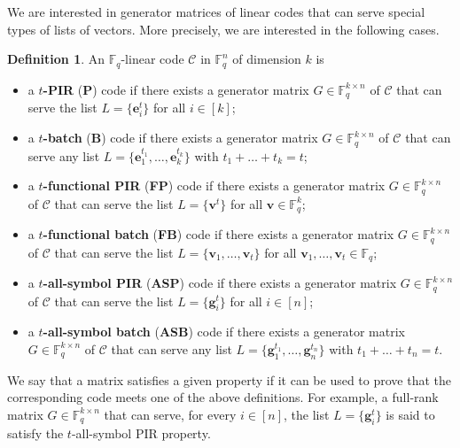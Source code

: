\documentclass[11pt,a4paper]{article}
\theoremstyle{definition}
\newtheorem{definition}[theorem]{Definition}
\newcommand{\bfe}{{\boldsymbol e}}
\newcommand{\bfg}{{\boldsymbol g}}
\newcommand{\bfv}{{\boldsymbol v}}
\newcommand{\F}{\mathbb{F}}
\newcommand{\mC}{\mathcal{C}}
\newcommand{\bcomment}[1]{{\color{blue}#1}}
\newcommand{\pcomment}[1]{{\color{purple}#1}}
\newcommand{\ey}[1]{{\footnotesize [\pcomment{#1}\;\;\bcomment{--Eitan}]}}
\begin{document}
We are interested in generator matrices of linear codes that can serve special types of lists of vectors. More precisely, we are interested in the following cases.

\begin{definition}
An $\F_q$-linear code $\mC$ in $\F_q^n$ of dimension $k$ is 
\begin{itemize}
    \item[(i)] a \textbf{$t$-PIR} (\textbf{P}) code if there exists a generator matrix $G \in \F_q^{k \times n}$ of $\mC$ that can serve the list $L=\{\bfe_i^t\}$ for all $i \in [k]$; 
    \item[(ii)] a \textbf{$t$-batch} (\textbf{B}) code if there exists a generator matrix $G \in \F_q^{k \times n}$ of $\mC$ that can serve any list $L=\{\bfe_1^{t_1},\dots,\bfe_k^{t_k}\}$ with $t_1+\dots + t_k=t$;
    \item[(iii)] a \textbf{$t$-functional PIR} (\textbf{FP}) code if there exists a generator matrix $G \in \F_q^{k \times n}$ of $\mC$ that can serve the list $L=\{\bfv^t\}$ for all $\bfv \in \F_q^k$;
    \item[(iv)] a \textbf{$t$-functional batch} (\textbf{FB}) code if there exists a generator matrix $G \in \F_q^{k \times n}$ of $\mC$ that can serve the list $L=\{\bfv_1,\dots,\bfv_t\}$ for all $\bfv_1,\dots,\bfv_t \in \F_q$;
    \item[(v)] a \textbf{$t$-all-symbol PIR} (\textbf{ASP}) code if there exists a generator matrix $G \in \F_q^{k \times n}$ of $\mC$ that can serve the list $L=\{\bfg_i^t\}$ for all $i \in [n]$; 
    \item[(vi)] a \textbf{$t$-all-symbol batch} (\textbf{ASB}) code if there exists a generator matrix $G \in \F_q^{k \times n}$ of $\mC$ that can serve any list $L=\{\bfg_1^{t_1},\dots,\bfg_n^{t_n}\}$ with $t_1+\dots + t_n=t$.
\end{itemize}
\end{definition}

We say that a matrix satisfies a given property if it can be used to prove that the corresponding code meets one of the above definitions. For example, a full-rank matrix $G \in \F_q^{k \times n}$ that can serve, for every $i \in [n]$, the list $L=\{\bfg_i^t\}$ is said to satisfy the $t$-all-symbol PIR property. 
\end{document}
